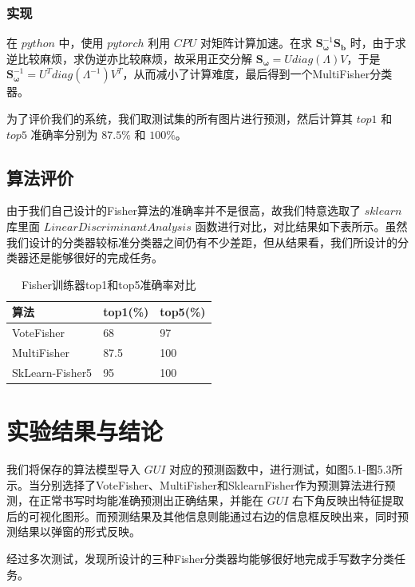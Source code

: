 \documentclass[UTF8, a4paper, 12pt]{report}
\begin{document}
		\subsection{实现}
			在 $python$ 中，使用 $pytorch$ 利用 $CPU$ 对矩阵计算加速。在求 $\bm{S}_{\bm{\omega}}^{-1} \bm{S}_{\bm{b}}$ 时，由于求逆比较麻烦，求伪逆亦比较麻烦，故采用正交分解 $\bm{S}_{\bm{\omega}} = U diag(\Lambda) V$，于是 $\bm{S}_{\bm{\omega}}^{-1} = U^T diag(\Lambda ^{-1}) V^T$，从而减小了计算难度，最后得到一个MultiFisher分类器。

			为了评价我们的系统，我们取测试集的所有图片进行预测，然后计算其 $top1$ 和 $top5$ 准确率分别为 $87.5\%$ 和 $100\%$。

	\section{算法评价}
		由于我们自己设计的Fisher算法的准确率并不是很高，故我们特意选取了 $sklearn$ 库里面 $LinearDiscriminantAnalysis$ 函数进行对比，对比结果如下表所示。虽然我们设计的分类器较标准分类器之间仍有不少差距，但从结果看，我们所设计的分类器还是能够很好的完成任务。

		\begin{table}[!h]
		\centering
		\caption{Fisher训练器top1和top5准确率对比}  
		\begin{tabular*}{8cm}{lll}  
		\hline  
		算法 & top1(\%)  & top5(\%) \\  
		\hline  
		\hline
		VoteFisher  & 68 & 97 \\  
		MultiFisher  & 87.5 & 100 \\  
		SkLearn-Fisher5 & 95 & 100\\
		\hline  
		\end{tabular*}  
		\end{table}  
\clearpage

\chapter{实验结果与结论}
	我们将保存的算法模型导入 $GUI$ 对应的预测函数中，进行测试，如图5.1-图5.3所示。当分别选择了VoteFisher、MultiFisher和SklearnFisher作为预测算法进行预测，在正常书写时均能准确预测出正确结果，并能在 $GUI$ 右下角反映出特征提取后的可视化图形。而预测结果及其他信息则能通过右边的信息框反映出来，同时预测结果以弹窗的形式反映。

		经过多次测试，发现所设计的三种Fisher分类器均能够很好地完成手写数字分类任务。
\end{document}
